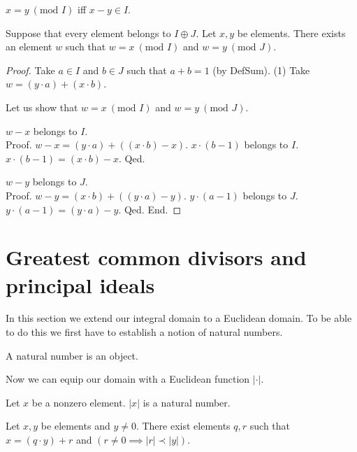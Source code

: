 \documentclass{article}
\renewcommand{\mod}{\text{mod }}
\begin{document}
  \begin{forthel}
    \begin{definition}[DefMod]
      $x = y ~(\mod I)$ iff $x - y \in I$.
    \end{definition}

    \begin{theorem}[ChineseRemainder]
      Suppose that every element belongs to $I \oplus J$. Let $x, y$ be elements. There exists an element $w$ such that $w = x ~(\mod I)$ and $w = y ~(\mod J)$.
    \end{theorem}
    \begin{proof}
      Take $a \in I$ and $b \in J$ such that $a + b = 1$ (by DefSum).
      (1) Take $w = (y \cdot a) + (x \cdot b)$.

      Let us show that $w = x ~(\mod I)$ and $w = y ~(\mod J)$.

        $w - x$ belongs to $I$. \\
        Proof.
          $w - x = (y \cdot a) + ((x \cdot b) - x)$. $x \cdot (b - 1)$ belongs to $I$. $x \cdot (b - 1) = (x \cdot b) - x$.
        Qed.

        $w - y$ belongs to $J$. \\
        Proof.
          $w - y = (x \cdot b) + ((y \cdot a) - y)$. $y \cdot (a - 1)$ belongs to $J$. $y \cdot (a - 1) = (y \cdot a) - y$.
        Qed.
      End.
    \end{proof}
  \end{forthel}


  \section{Greatest common divisors and principal ideals}

  In this section we extend our integral domain to a Euclidean domain. To be able to do this we first have to establish a notion of natural numbers.

  \begin{forthel}

    \begin{signature}[NatSort]
      A natural number is an object.
    \end{signature}

  \end{forthel}

  Now we can equip our domain with a Euclidean function $|\cdot|$.

  \begin{forthel}
    \begin{signature}[EucSort]
      Let $x$ be a nonzero element. $|x|$ is a natural number.
    \end{signature}

    \begin{axiom}[Division]
      Let $x,y$ be elements and $y \neq 0$. There exist elements $q,r$ such that $x = (q \cdot y) + r$ and $(r \neq 0 \implies |r| \prec |y|)$.
    \end{axiom}
  \end{forthel}
\end{document}
